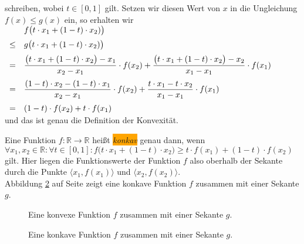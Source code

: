 \begin{Definition}
schreiben, wobei $t \in [0,1]$ gilt.  Setzen wir diesen Wert von $x$ in die Ungleichung $f(x) \leq g(x)$
ein, so erhalten wir 
\\[0.2cm]
\hspace*{1.3cm}
$
\begin{array}[t]{cl}
      &  f\bigl(t \cdot x_1 + (1-t) \cdot x_2)\bigr) \\[0.2cm]
 \leq & g\bigl(t \cdot x_1 + (1-t) \cdot x_2)\bigr)  \\[0.2cm]
  =   & \displaystyle \frac{\bigl(t \cdot x_1 + (1-t) \cdot x_2\bigr) - x_1}{x_2-x_1} \cdot f(x_2) + 
            \frac{\bigl(t \cdot x_1 + (1-t) \cdot x_2\bigr) - x_2}{x_1-x_1} \cdot f(x_1) 
        \\[0.4cm]
  =   & \displaystyle \frac{(1-t) \cdot x_2 - (1-t) \cdot x_1}{x_2-x_1} \cdot f(x_2) + 
            \frac{t \cdot x_1 - t \cdot x_2}{x_1-x_1} \cdot f(x_1) 
        \\[0.4cm]
  =   & \displaystyle (1-t) \cdot f(x_2) + t \cdot f(x_1) 
\end{array}
$
\\[0.2cm]
und das ist genau die Definition der Konvexit\"at.
\vspace*{0.2cm}

Eine Funktion $f:\mathbb{R} \rightarrow \mathbb{R}$ hei{\ss}t \colorbox{orange}{\emph{konkav}} genau dann, wenn 
\\[0.2cm]
\hspace*{1.3cm}
$\forall x_1,x_2 \in \mathbb{R}:\forall t\in [0,1]: 
  f\bigl(t \cdot x_1 + (1-t)\cdot x_2\bigr) \geq t \cdot f(x_1) + (1 - t) \cdot f(x_2)
$
\\[0.2cm]
gilt.  Hier liegen die Funktionswerte der Funktion $f$ also oberhalb 
der Sekante durch die Punkte 
$\bigl\langle x_1, f(x_1) \bigl\rangle$ und $\bigl\langle x_2, f(x_2) \bigl\rangle$.
\\[0.2cm]
Abbildung \ref{fig:concav.eps} auf Seite \pageref{fig:concav.eps} zeigt eine konkave Funktion $f$
zusammen mit einer Sekante $g$.  
\eod
\end{Definition}

\begin{figure}[!h]
  \centering
   \caption{Eine konvexe Funktion $f$ zusammen mit einer Sekante $g$.}
  \label{fig:convex.eps}
\end{figure}
\begin{figure}[!h]
  \centering
   \caption{Eine konkave Funktion $f$ zusammen mit einer Sekante $g$.}
  \label{fig:concav.eps}
\end{figure}




